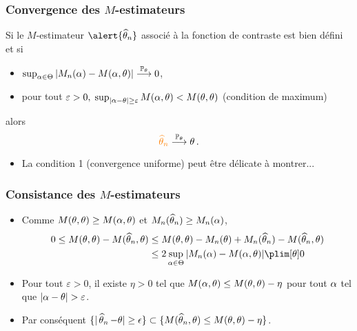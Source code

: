 \begin{frame}
\frametitle{Convergence des $M$-estimateurs}
\begin{prop}
Si le $M$-estimateur $\alert{\est}$ associé à la fonction de contraste est bien défini et si
\begin{itemize}
\item $\sup_{\alpha \in \Theta}|M_n(\alpha)-M(\alpha,\theta)| \stackrel{\operatorname{{\mathbb P}}_\theta}{\longrightarrow} 0$,
\item pour tout $\varepsilon >0, \;\sup_{|\alpha-\theta| \geq \varepsilon}M(\alpha,\theta)<M(\theta,\theta)$ \alert{(condition de maximum)}
\end{itemize}
alors
$$
\tco{\est} \stackrel{\PP_\truetheta}{\longrightarrow} \truetheta \eqsp.
$$
\end{prop}
\begin{itemize}
\item La condition 1 (convergence uniforme) peut être délicate à montrer...
\end{itemize}
\end{frame}

\begin{frame}
\frametitle{Consistance des $M$-estimateurs}
\begin{itemize}
\item Comme $M(\theta,\theta) \geq M(\alpha,\theta)$ et $M_n(\operatorname{\widehat \theta_{\mathnormal{n}}}) \geq M_n(\alpha)$,
\begin{align*}
0 \leq M(\truetheta,\truetheta) - M(\est,\truetheta) 
&\leq M(\truetheta,\truetheta) - M_n(\truetheta) + M_n(\est) - M(\est,\truetheta) \\
&\leq 2 \sup_{\curtheta \in \Theta} |M_n(\curtheta)- M(\curtheta,\truetheta)| \plim[\truetheta] 0
\end{align*}
\pause \item Pour tout $\varepsilon > 0$, il existe $\eta > 0$ tel que $M(\alpha,\theta) \leq M(\theta,\theta)-\eta$ pour tout $\alpha$ tel que $|\alpha-\theta| > \varepsilon$.
\pause \item Par conséquent $\{ |\operatorname{\widehat \theta_{\mathnormal{n}}} - \theta| \geq \epsilon \} \subset \{ M(\operatorname{\widehat \theta_{\mathnormal{n}}},\theta) \leq M(\theta,\theta)-\eta\}$.
\end{itemize}
\end{frame}

